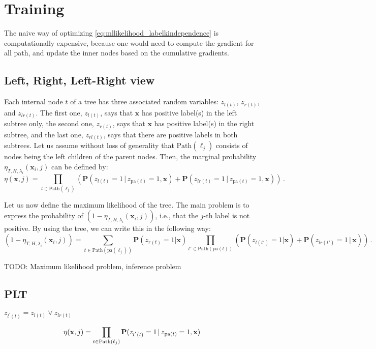 \documentclass{article}
\newcommand{\Path}[1]{\mathrm{Path}(#1)}
\newcommand{\pa}[1]{\mathrm{pa}(#1)}
\newcommand{\bx}{\mathbf{x}}
\newcommand{\prob}{\mathbf{P}}
\newcommand{\given}{\, | \,}
\newcommand{\Algo}[1]{\textsc{#1}}
\begin{document}
\section{Training}

The naive way of optimizing \ref{eq:mllikelihood_labelkindependence} is computationally expensive, because one would need to compute the gradient for all path, and update the inner nodes based on the cumulative gradients. 

\subsection{Left, Right, Left-Right view}

Each internal node $t$ of a tree has three associated random variables: $z_{l(t)}$, $z_{r(t)}$, and $z_{lr(t)}$. The first one, $z_{l(t)}$, says that $\bx$ has positive label(s) in the left subtree only, the second one, $z_{r(t)}$, says that $\bx$ has positive label(s) in the right subtree, and the last one, $z_{rl(t)}$, says that there are positive labels in both subtrees. Let us assume without loss of generality that $\Path{\ell_j}$ consists of nodes being the left children of the parent nodes. Then, the marginal probability $\eta_{T,H,\lambda_i} ( \bx_i , j )$ can be defined by:
\begin{equation}
\eta(\bx, j) = \prod_{t \in \Path{\ell_j}}  \left ( \prob(z_{l(t)} = 1 \given z_{\pa{t}} =1, \bx) + \prob(z_{lr(t)} = 1 \given z_{\pa{t}} =1, \bx) \right ) \,.
\label{eqn:probabilistic_tree}
\end{equation}

Let us now define the maximum likelihood of the tree. The main problem is to express the probability of  $(1-\eta_{T,H,\lambda_i} ( \bx_i , j ))$, i.e., that the $j$-th label is not positive. By using the tree, we can write this in the following way:
\[
(1-\eta_{T,H,\lambda_i} ( \bx_i , j )) = \sum_{t \in \Path{\pa{\ell_j}}}   \prob(z_{r(t)} = 1 | \bx)  \prod_{t' \in \Path{\pa{t}}} \left ( \prob(z_{l(t')} = 1 | \bx) + \prob(z_{lr(t')} = 1 \given \bx) \right )  \,.
\]

TODO: Maximum likelihood problem, inference problem


\subsection{\Algo{PLT}}

$z_{l^{\prime}(t)} = z_{l(t)} \vee z_{lr(t)}$ 

\begin{equation}
\eta(\bx, j) = \prod_{t \in \Path{\ell_j}} \prob(z_{l^{'}(t)} = 1 \given z_{\pa{t}} =1, \bx)\notag 
\end{equation}
\end{document}
